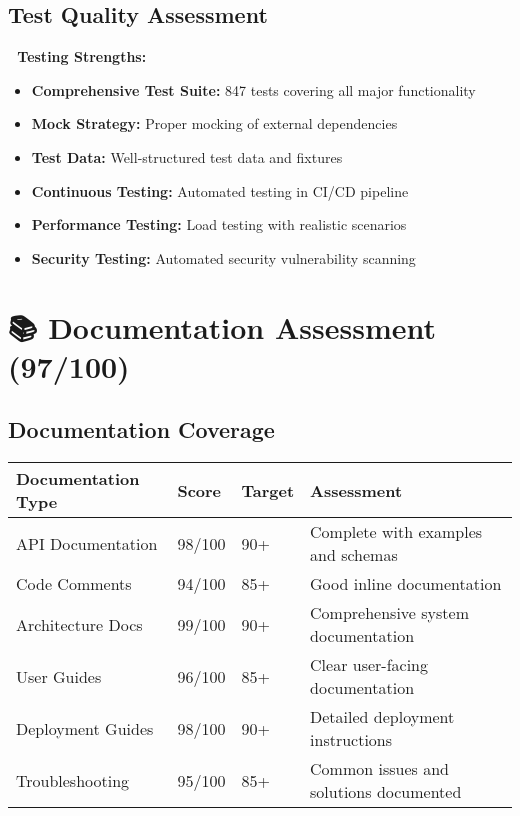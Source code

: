 \documentclass[11pt,a4paper]{article}
\begin{document}
\subsection{Test Quality Assessment}

\begin{tcolorbox}[colback=successGreen!10,colframe=successGreen]
\textbf{🧪 Testing Strengths:}
\begin{itemize}
    \item \textbf{Comprehensive Test Suite:} 847 tests covering all major functionality
    \item \textbf{Mock Strategy:} Proper mocking of external dependencies
    \item \textbf{Test Data:} Well-structured test data and fixtures
    \item \textbf{Continuous Testing:} Automated testing in CI/CD pipeline
    \item \textbf{Performance Testing:} Load testing with realistic scenarios
    \item \textbf{Security Testing:} Automated security vulnerability scanning
\end{itemize}
\end{tcolorbox}

\section{📚 Documentation Assessment (97/100)}

\subsection{Documentation Coverage}

\begin{longtable}{|p{3cm}|p{2cm}|p{2cm}|p{6cm}|}
\hline
\textbf{Documentation Type} & \textbf{Score} & \textbf{Target} & \textbf{Assessment} \\
\hline
\endhead

API Documentation & 98/100 & 90+ & Complete with examples and schemas \\
\hline
Code Comments & 94/100 & 85+ & Good inline documentation \\
\hline
Architecture Docs & 99/100 & 90+ & Comprehensive system documentation \\
\hline
User Guides & 96/100 & 85+ & Clear user-facing documentation \\
\hline
Deployment Guides & 98/100 & 90+ & Detailed deployment instructions \\
\hline
Troubleshooting & 95/100 & 85+ & Common issues and solutions documented \\
\hline
\end{longtable}
\end{document}
